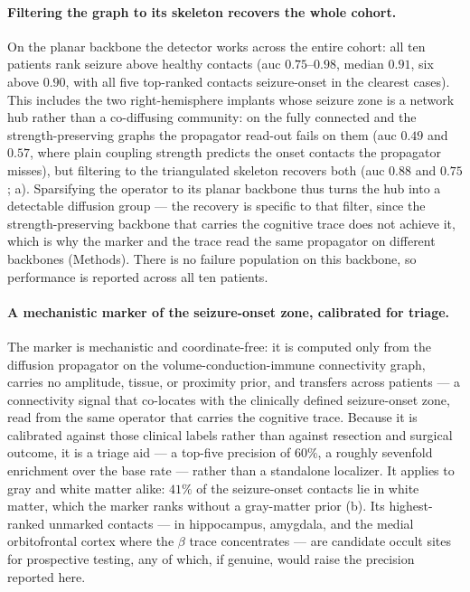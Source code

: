 \paragraph{Filtering the graph to its skeleton recovers the whole cohort.}
On the planar backbone the detector works across the entire cohort: all ten patients rank seizure above healthy contacts (\gls{auc} \(0.75\)--\(0.98\), median \(0.91\), six above \(0.90\), with all five top-ranked contacts seizure-onset in the clearest cases). This includes the two right-hemisphere implants whose seizure zone is a network hub rather than a co-diffusing community: on the fully connected and the strength-preserving graphs the propagator read-out fails on them (\gls{auc} \(0.49\) and \(0.57\), where plain coupling strength predicts the onset contacts the propagator misses), but filtering to the triangulated skeleton recovers both (\gls{auc} \(0.88\) and \(0.75\); a). Sparsifying the operator to its planar backbone thus turns the hub into a detectable diffusion group --- the recovery is specific to that filter, since the strength-preserving backbone that carries the cognitive trace does not achieve it, which is why the marker and the trace read the same propagator on different backbones (Methods). There is no failure population on this backbone, so performance is reported across all ten patients.

\paragraph{A mechanistic marker of the seizure-onset zone, calibrated for triage.}
The marker is mechanistic and coordinate-free: it is computed only from the diffusion propagator on the volume-conduction-immune connectivity graph, carries no amplitude, tissue, or proximity prior, and transfers across patients --- a connectivity signal that co-locates with the clinically defined seizure-onset zone, read from the same operator that carries the cognitive trace. Because it is calibrated against those clinical labels rather than against resection and surgical outcome, it is a triage aid --- a top-five precision of \(60\%\), a roughly sevenfold enrichment over the base rate --- rather than a standalone localizer. It applies to gray and white matter alike: \(41\%\) of the seizure-onset contacts lie in white matter, which the marker ranks without a gray-matter prior (b). Its highest-ranked unmarked contacts --- in hippocampus, amygdala, and the medial orbitofrontal cortex where the \(\beta\) trace concentrates --- are candidate occult sites for prospective testing, any of which, if genuine, would raise the precision reported here.

